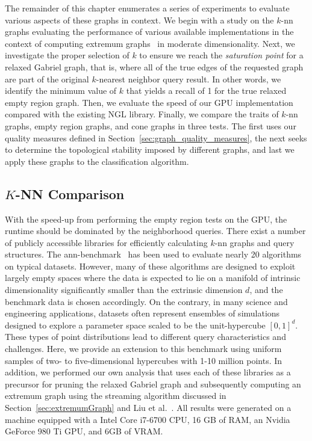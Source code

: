 The remainder of this chapter enumerates a series of experiments to evaluate various aspects of these graphs in context.
%
We begin with a study on the $k$-nn graphs evaluating the performance of various available implementations in the context of computing extremum graphs~\cite{CorreaLindstromBremer2011} in moderate dimensionality.
%
Next, we investigate the proper selection of $k$ to ensure we reach the \textit{saturation point} for a relaxed Gabriel graph, that is, where all of the true edges of the requested graph are part of the original $k$-nearest neighbor query result.
%
In other words, we identify the minimum value of $k$ that yields a recall of 1 for the true relaxed empty region graph.
%
Then, we evaluate the speed of our GPU implementation compared with the existing NGL library.
%
Finally, we compare the traits of $k$-nn graphs, empty region graphs, and cone graphs in three tests.
%
The first uses our quality measures defined in Section~\ref{sec:graph_quality_measures}, the next seeks to determine the topological stability imposed by different graphs, and last we apply these graphs to the classification algorithm.

\subsection{$K$-NN Comparison}
\label{sec:knn_benchmark}

With the speed-up from performing the empty region tests on the GPU, the runtime should be dominated by the neighborhood queries.
%
There exist a number of publicly accessible libraries for efficiently calculating $k$-nn graphs and query structures.
%
The ann-benchmark~\cite{AumullerBernhardssonFaithfull2018} has been used to evaluate nearly 20 algorithms on typical datasets.
%
However, many of these algorithms are designed to exploit largely empty spaces where the data is expected to lie on a manifold of intrinsic dimensionality significantly smaller than the extrinsic dimension $d$, and the benchmark data is chosen accordingly.
%
On the contrary, in many science and engineering applications, datasets often represent ensembles of simulations designed to explore a parameter space scaled to be the unit-hypercube $[0,1]^d$.
%
These types of point distributions lead to different query characteristics and challenges.
%
Here, we provide an extension to this benchmark using uniform samples of two- to five-dimensional hypercubes with 1-10 million points.
%
In addition, we performed our own analysis that uses each of these libraries as a precursor for pruning the relaxed Gabriel graph and subsequently computing an extremum graph using the streaming algorithm discussed in Section~\ref{sec:extremumGraph} and Liu et al.~\cite{LiuWangMaljovec2019}.
%
All results were generated on a machine equipped with a Intel Core i7-6700 CPU, 16 GB of RAM, an Nvidia GeForce 980 Ti GPU, and 6GB of VRAM.

